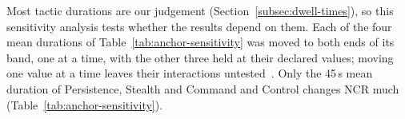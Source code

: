 \documentclass{cshonours}
\begin{document}

Most tactic durations are our judgement (Section~\ref{subsec:dwell-times}),
so this sensitivity analysis tests whether the results depend on them. Each
of the four mean durations of Table~\ref{tab:anchor-sensitivity} was moved to both ends
of its band, one at a time, with the other three held at their declared values;
moving one value at a time leaves their interactions
untested~\citep{saltelli2019}. Only the 45\,s mean duration of Persistence,
Stealth and Command and Control changes NCR much (Table~\ref{tab:anchor-sensitivity}).
\end{document}
